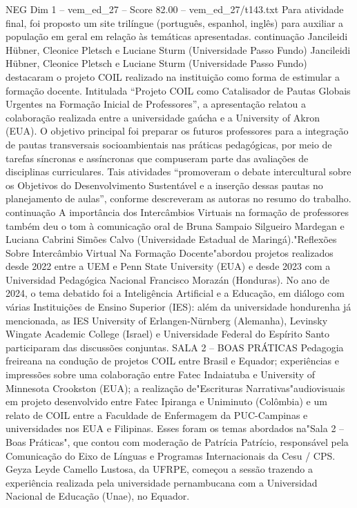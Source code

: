 \begin{textsample}{NEG Dim 1 – vem\_ed\_27 – Score 82.00 – vem\_ed\_27/t143.txt}
Para atividade final, foi proposto um site trilíngue (português, espanhol, inglês) para auxiliar a população em geral em relação às temáticas apresentadas. continuação Jancileidi Hübner, Cleonice Pletsch e Luciane Sturm (Universidade Passo Fundo) Jancileidi Hübner, Cleonice Pletsch e Luciane Sturm (Universidade Passo Fundo) destacaram o projeto COIL realizado na instituição como forma de estimular a formação docente.
Intitulada “Projeto COIL como Catalisador de Pautas Globais Urgentes na Formação Inicial de Professores”, a apresentação relatou a colaboração realizada entre a universidade gaúcha e a University of Akron (EUA).
O objetivo principal foi preparar os futuros professores para a integração de pautas transversais socioambientais nas práticas pedagógicas, por meio de tarefas síncronas e assíncronas que compuseram parte das avaliações de disciplinas curriculares.
Tais atividades “promoveram o debate intercultural sobre os Objetivos do Desenvolvimento Sustentável e a inserção dessas pautas no planejamento de aulas”, conforme descreveram as autoras no resumo do trabalho. continuação A importância dos Intercâmbios Virtuais na formação de professores também deu o tom à comunicação oral de Bruna Sampaio Silgueiro Mardegan e Luciana Cabrini Simões Calvo (Universidade Estadual de Maringá)."Reflexões Sobre Intercâmbio Virtual Na Formação Docente"abordou projetos realizados desde 2022 entre a UEM e Penn State University (EUA) e desde 2023 com a Universidad Pedagógica Nacional Francisco Morazán (Honduras).
No ano de 2024, o tema debatido foi a Inteligência Artificial e a Educação, em diálogo com várias Instituições de Ensino Superior (IES): além da universidade hondurenha já mencionada, as IES University of Erlangen-Nürnberg (Alemanha), Levinsky Wingate Academic College (Israel) e Universidade Federal do Espírito Santo participaram das discussões conjuntas.
SALA 2 – BOAS PRÁTICAS Pedagogia freireana na condução de projetos COIL entre Brasil e Equador; experiências e impressões sobre uma colaboração entre Fatec Indaiatuba e University of Minnesota Crookston (EUA); a realização de"Escrituras Narrativas"audiovisuais em projeto desenvolvido entre Fatec Ipiranga e Uniminuto (Colômbia) e um relato de COIL entre a Faculdade de Enfermagem da PUC-Campinas e universidades nos EUA e Filipinas.
Esses foram os temas abordados na"Sala 2 – Boas Práticas", que contou com moderação de Patrícia Patrício, responsável pela Comunicação do Eixo de Línguas e Programas Internacionais da Cesu / CPS.
Geyza Leyde Camello Lustosa, da UFRPE, começou a sessão trazendo a experiência realizada pela universidade pernambucana com a Universidad Nacional de Educação (Unae), no Equador.

\end{textsample}
